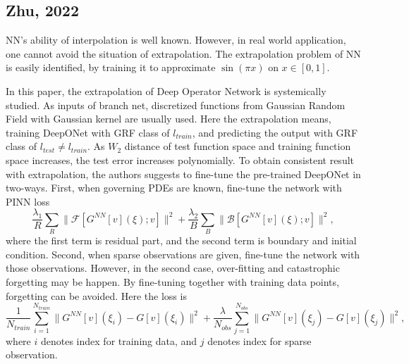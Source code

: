 \subsection{Zhu, 2022 \cite{DeepONet-extrapolation}}

NN's ability of interpolation is well known.
However, in real world application,
one cannot avoid the situation of extrapolation.
The extrapolation problem of NN is easily identified,
by training it to approximate $\sin (\pi x)$ on $x\in[0,1]$.

In this paper, the extrapolation of Deep Operator Network is systemically studied.
As inputs of branch net, 
discretized functions from Gaussian Random Field with Gaussian kernel are usually used.
Here the extrapolation means, training DeepONet with GRF class of $l_{train}$,
and predicting the output with GRF class of $l_{test} \ne l_{train}$.
As $W_2$ distance of test function space and training function space increases,
the test error increases polynomially.
To obtain consistent result with extrapolation,
the authors suggests to fine-tune the pre-trained DeepONet in two-ways.
First, when governing PDEs are known, fine-tune the network with PINN loss
\[
    \frac{\lambda_1}{R}\sum_R \|\mathcal{F}[G^{NN}[v](\xi);v]\|^2 + \frac{\lambda_2}{B}\sum_B \|\mathcal{B}[G^{NN}[v](\xi);v]\|^2,
\]
where the first term is residual part, and the second term is boundary and initial condition.
Second, when sparse observations are given, fine-tune the network with those observations.
However, in the second case, over-fitting and catastrophic forgetting may be happen.
By fine-tuning together with training data points, forgetting can be avoided.
Here the loss is
\[
    \frac{1}{N_{train}}\sum_{i=1}^{N_{train}} \|G^{NN}[v](\xi_i) - G[v](\xi_i)\|^2 + \frac{\lambda}{N_{obs}}\sum_{j=1}^{N_{obs}}\|G^{NN}[v](\xi_j)-G[v](\xi_j)\|^2,
\]
where $i$ denotes index for training data, and $j$ denotes index for sparse observation.
